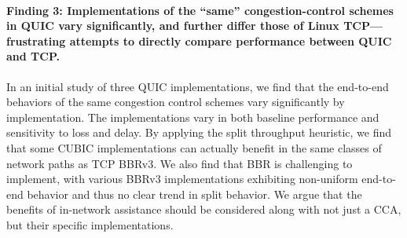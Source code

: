 


\paragraph{Finding 3: Implementations of the ``same'' congestion-control schemes
in QUIC vary significantly, and further differ those of Linux TCP---frustrating
attempts to directly compare performance between QUIC and TCP.}

In an initial study of three QUIC implementations, we find that the end-to-end
behaviors of the same congestion control schemes vary significantly by implementation.
The implementations vary in both baseline performance and sensitivity to loss
and delay. By applying the split throughput heuristic, we find that some
CUBIC implementations can actually benefit in the same classes of network paths
as TCP BBRv3. We also find that BBR is challenging to implement, with various
BBRv3 implementations exhibiting non-uniform end-to-end behavior and thus no
clear trend in split behavior. We argue that the benefits of in-network
assistance should be considered along with not just a CCA, but their specific
implementations. \\

